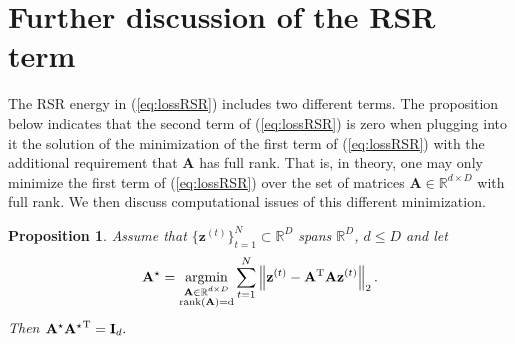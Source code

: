 \documentclass{article} \usepackage{iclr2020_conference,times}
\def\eqref#1{(\ref{#1})}
\def\rvz{{\mathbf{z}}}
\def\rmA{{\mathbf{A}}}
\def\rmI{{\mathbf{I}}}
\newcommand{\R}{\mathbb{R}}
\newtheorem{proposition}{Proposition}[section]
\newcommand{\norm}[1]{\left\lVert#1\right\rVert}
\begin{document}
\newpage

\section{Further discussion of the RSR term}
\label{sec:more_RSR_term}

The RSR energy in \eqref{eq:lossRSR} includes two different terms. 
The proposition below indicates that the second term of \eqref{eq:lossRSR} is zero when plugging into it the solution of the minimization of the first term of \eqref{eq:lossRSR} with the additional requirement that $\rmA$ has full rank. That is, in theory, one may only minimize the first term of \eqref{eq:lossRSR} over the set of matrices $\rmA \in \R^{d \times D}$ with full rank. We then discuss computational issues of this different minimization.

\begin{proposition}\label{prop:noneedboth}
Assume that $\{ \rvz^{(t)} \}_{t=1}^N \subset \R^D$ spans $\R^D$, $d \leqslant D$ and let
\begin{equation}\label{op2}
    \rmA^{\star} =  \argminB_{\substack{\rmA \in \R^{d \times D} \\ \rm{rank}(\rmA) = d}} \sum_{t=1} ^{N} \norm{ \rvz^{(t)} - \rmA^{\rm{T}}\rmA \rvz^{(t)} }_2 .
\end{equation}
Then $\rmA^{\star} {\rmA^{\star}}^{\rm{T}} = \rmI_d.$
\end{proposition}
\end{document}
